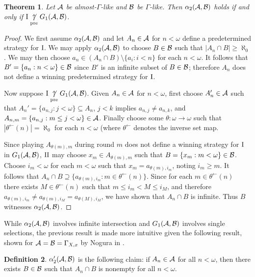 \documentclass{amsart}
\theoremstyle{plain}
\newtheorem{theorem}{Theorem}
\theoremstyle{definition}
\newtheorem{definition}[theorem]{Definition}
\theoremstyle{remark}
\theoremstyle{plain}
\theoremstyle{definition}
\theoremstyle{remark}
\begin{document}
\begin{theorem}
Let \(\mathcal{A}\) be almost-\(\Gamma\)-like and \(\mathcal{B}\) be \(\Gamma\)-like. 
Then \(\alpha_2(\mathcal{A},\mathcal{B})\) holds if and only
if \(\mathrm{I}\underset{\text{pre}}{\not\uparrow} G_1(\mathcal{A},\mathcal{B})\).
\end{theorem}

\begin{proof}
We first assume \(\alpha_2(\mathcal{A},\mathcal{B})\) and let \(A_n\in\mathcal{A}\) for \(n<\omega\)
define a predetermined strategy for \(\mathrm{I}\).
We may apply \(\alpha_2(\mathcal{A},\mathcal{B})\) to choose \(B\in\mathcal{B}\) such that
\(|A_n\cap B|\geq\aleph_0\). We may then choose \(a_n\in(A_n\cap B)\setminus\{a_i:i<n\}\)
for each \(n<\omega\). It follows that \(B'=\{a_n:n<\omega\}\in\mathcal{B}\) since
\(B'\) is an infinite subset of \(B\in\mathcal{B}\); therefore \(A_n\) does not define
a winning predetermined strategy for \(\mathrm{I}\).

Now suppose \(\mathrm{I}\underset{\text{pre}}{\not\uparrow} G_1(\mathcal{A},\mathcal{B})\). Given \(A_n\in\mathcal{A}\) for \(n<\omega\),
first choose \(A_n'\in\mathcal{A}\) such that \(A_n'=\{a_{n,j}:j<\omega\}\subseteq A_n\),
\(j<k\) implies \(a_{n,j}\not=a_{n,k}\),
and \(A_{n,m}=\{a_{n,j}:m\leq j<\omega\}\in\mathcal{A}\).
Finally choose
some \(\theta:\omega\to\omega\) such that \(|\theta^{\leftarrow}(n)|=\aleph_0\) for
each \(n<\omega\)
(where \(\theta^{\leftarrow}\) denotes the inverse set map.

Since playing \(A_{\theta(m),m}\) during round \(m\)
does not define a winning strategy for \(\mathrm{I}\) in
\(G_1(\mathcal{A},\mathcal{B})\), \(\mathrm{II}\) may choose \(x_m\in A_{\theta(m),m}\)
such that \(B=\{x_m:m<\omega\}\in\mathcal{B}\).
Choose \(i_m<\omega\) for each \(m<\omega\) such that
\(x_m=a_{\theta(m),i_m}\), noting \(i_m\geq m\).
It follows that 
\(A_n\cap B\supseteq\{a_{\theta(m),i_m}:m\in\theta^{\leftarrow}(n)\}\).
Since for each \(m\in\theta^{\leftarrow}(n)\) there exists
\(M\in\theta^{\leftarrow}(n)\) such that \(m\leq i_m<M\leq i_{M}\),
and therefore \(a_{\theta(m),i_m}\not=a_{\theta(m),i_{M}}=a_{\theta(M),i_{M}}\),
we have shown that \(A_n\cap B\) is infinite. Thus \(B\) witnesses
\(\alpha_2(\mathcal{A},\mathcal{B})\).
\end{proof}

While \(\alpha_2(\mathcal{A},\mathcal{B})\) involves infinite intersection and
\(G_1(\mathcal{A},\mathcal{B})\) involves single selections, the previous result is made
more intuitive given the following result, shown for \(\mathcal{A}=\mathcal{B}=\Gamma_{X,x}\)
by Nogura in \cite{MR812643}.

\begin{definition}
\(\alpha_2'(\mathcal{A},\mathcal{B})\) is the following claim:
if \(A_n\in\mathcal{A}\) for all \(n<\omega\), then there exists \(B\in\mathcal{B}\) such that
\(A_n\cap B\) is nonempty for all \(n<\omega\).
\end{definition}
\end{document}
